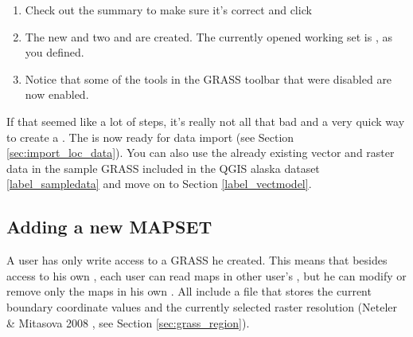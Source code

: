 \begin{enumerate}
  \footnote{When creating a new , GRASS automatically
  creates a special  called  designed to
  store the core data for the project, its default spatial extend and
  coordinate system definitions (Neteler \& Mitasova 2008
  \cite{neteler_mitasova08}).}
  \item Check out the summary to make sure it's correct and click
  \item The new  and two 
  and  are created. The currently opened working set is
  , as you defined.
  \item Notice that some of the tools in the GRASS toolbar that were
  disabled are now enabled.
\end{enumerate}

If that seemed like a lot of steps, it's really not all that bad and a very
quick way to create a . The  is
now ready for data import (see Section \ref{sec:import_loc_data}).
You can also use the already existing vector and raster data in the sample
GRASS  included in the QGIS alaska dataset
\ref{label_sampledata} and move on to Section \ref{label_vectmodel}.

\subsection{Adding a new MAPSET}\label{sec:add_mapset}

A user has only write access to a GRASS  he created. This
means that besides access to his own , each user can read
maps in other user's , but he can modify or remove only
the maps in his own . All  include a
 file that stores the current boundary coordinate values and
the currently selected raster resolution (Neteler \& Mitasova 2008
\cite{neteler_mitasova08}, see Section \ref{sec:grass_region}).

